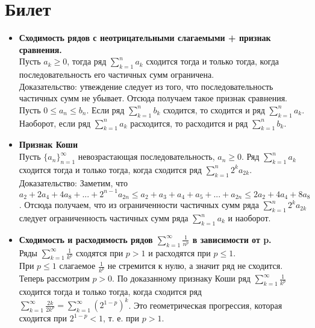 \documentclass[12pt,a4paper]{article}
\begin{document}
\section{Билет}
\begin{itemize}
  \item \textbf{Сходимость рядов с неотрицательными слагаемыми + признак сравнения.}\\ 
  Пусть $a_k \geq 0$, тогда ряд $\sum_{k = 1}^n a_k$ сходится тогда и только тогда, когда последовательность его частичных сумм ограничена.\\
  Доказательство: утвеждение следует из того, что последовательность частичных сумм не убывает. Отсюда получаем такое признак сравнения.\\
  Пусть $0 \leq a_n \leq b_n$. Если ряд $\sum_{k = 1}^n b_k$ сходится, то сходится и ряд $\sum_{k = 1}^n a_k$.\\
  Наоборот, если ряд $\sum_{k = 1}^n a_k$ расходится, то расходится и ряд $\sum_{k = 1}^n b_k$.\\
  \item \textbf{Признак Коши}\\
  Пусть $\{a_n\}_{n = 1}^{\infty}$ невозрастающая последовательность, $a_n \geq 0$. Ряд $\sum_{k = 1}^n a_k$ сходится тогда и только тогда, когда сходится ряд $\sum_{k = 1}^n 2^k a_{2k}$.\\
  Доказательство: Заметим, что $a_2 + 2a_4 + 4a_8 + ... + 2^{n - 1} a_{2n} \leq a_2 + a_3 + a_4 + a_5 + ... + a_{2n} \leq 2a_2 + 4a_4 + 8a_8$. Отсюда получаем, что из ограниченности частичных сумм ряда $\sum_{k = 1}^n 2^k a_{2k}$ следует ограниченность частичных сумм ряда $\sum_{k = 1}^n a_k$ и наоборот.\\
\item \textbf{Сходимость и расходимость рядов $\sum_{k = 1}^{\infty} \frac{1}{n^p}$ в зависимости от p.}\\
Ряды $\sum_{k = 1}^{\infty} \frac{1}{k^p}$ сходятся при $p > 1$ и расходятся при $p \leq 1$.\\
При $p \leq 1$ слагаемое $\frac{1}{k^p}$ не стремится к нулю, а значит ряд не сходится.\\
Теперь рассмотрим $p > 0$. По доказанному признаку Коши ряд $\sum_{k = 1}^{\infty} \frac{1}{k^p}$ сходится тогда и только тогда, когда сходится ряд $\sum_{k = 1}^{\infty} \frac{2k}{2k^p} = \sum_{k = 1}^{\infty} (2^{1 - p})^k$. Это геометрическая прогрессия, которая сходится при $2^{1 - p} < 1$, т. е. при $p > 1$.
\end{itemize}
\end{document}
